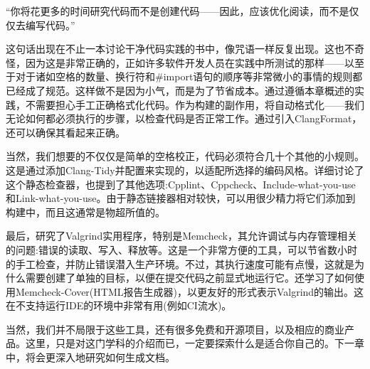 “你将花更多的时间研究代码而不是创建代码——因此，应该优化阅读，而不是仅仅去编写代码。”

这句话出现在不止一本讨论干净代码实践的书中，像咒语一样反复出现。这也不奇怪，因为这是非常正确的，正如许多软件开发人员在实践中所测试的那样——以至于对于诸如空格的数量、换行符和\#import语句的顺序等非常微小的事情的规则都已经成了规范。这样做不是因为小气，而是为了节省成本。通过遵循本章概述的实践，不需要担心手工正确格式化代码。作为构建的副作用，将自动格式化——我们无论如何都必须执行的步骤，以检查代码是否正常工作。通过引入ClangFormat，还可以确保其看起来正确。

当然，我们想要的不仅仅是简单的空格校正，代码必须符合几十个其他的小规则。这是通过添加Clang-Tidy并配置来实现的，以适配所选择的编码风格。详细讨论了这个静态检查器，也提到了其他选项:Cpplint、Cppcheck、Include-what-you-use和Link-what-you-use。由于静态链接器相对较快，可以用很少精力将它们添加到构建中，而且这通常是物超所值的。

最后，研究了Valgrind实用程序，特别是Memcheck，其允许调试与内存管理相关的问题:错误的读取、写入、释放等。这是一个非常方便的工具，可以节省数小时的手工检查，并防止错误潜入生产环境。不过，其执行速度可能有点慢，这就是为什么需要创建了单独的目标，以便在提交代码之前显式地运行它。还学习了如何使用Memcheck-Cover(HTML报告生成器)，以更友好的形式表示Valgrind的输出。这在不支持运行IDE的环境中非常有用(例如CI流水)。

当然，我们并不局限于这些工具，还有很多免费和开源项目，以及相应的商业产品。这里，只是对这门学科的介绍而已，一定要探索什么是适合你自己的。下一章中，将会更深入地研究如何生成文档。
